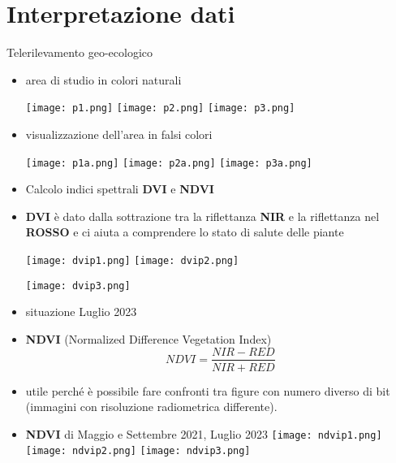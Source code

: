 \documentclass{beamer}
\begin{document}
\section{Interpretazione dati}
\begin{frame}{Telerilevamento geo-ecologico}
\begin{itemize}
    \item area di studio in colori naturali 
    
    \texttt{[image: p1.png]}
    \texttt{[image: p2.png]}
    \centering
    \texttt{[image: p3.png]}
    
\end{itemize}  
\end{frame}
\begin{itemize}
    \item visualizzazione dell'area in falsi colori
    
 \texttt{[image: p1a.png]}
    \texttt{[image: p2a.png]}
    \centering
    \texttt{[image: p3a.png]}
\end{itemize}
\begin{itemize}
    \item Calcolo indici spettrali \textbf{DVI} e \textbf{NDVI}
    \item \textbf{DVI} è dato dalla sottrazione tra la riflettanza \textbf{NIR} e la riflettanza nel \textbf{ROSSO} e ci aiuta a comprendere lo stato di salute delle piante

\texttt{[image: dvip1.png]}
\texttt{[image: dvip2.png]}

\texttt{[image: dvip3.png]}
\item situazione Luglio 2023
 
\end{itemize}
\newpage
\begin{itemize}
    \item \textbf{NDVI} (Normalized Difference Vegetation Index) 
    \begin{equation}
        NDVI =\frac{NIR-RED}{NIR+RED}
    \end{equation}
    \item utile perché è possibile fare confronti tra figure con numero diverso di bit (immagini con risoluzione radiometrica differente).

\end{itemize}
\newpage
\begin{itemize}
    \item \textbf{NDVI} di Maggio e Settembre 2021, Luglio 2023
\texttt{[image: ndvip1.png]}
\texttt{[image: ndvip2.png]}
\centering
\texttt{[image: ndvip3.png]}
    
\end{itemize}
\end{document}
